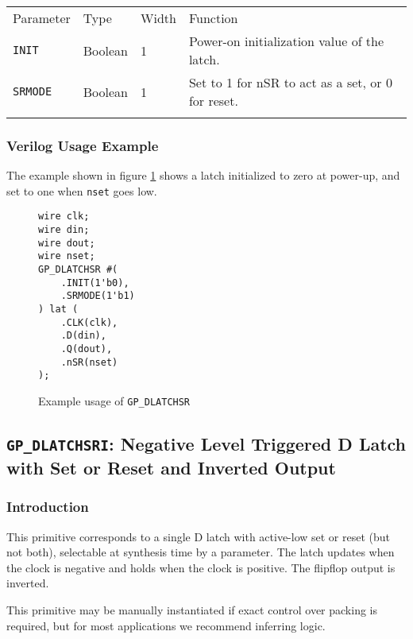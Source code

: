 \documentclass[11pt]{article}
\newcommand{\tokenstyle}[1]{\texttt{#1}}
\newcommand{\wirestyle}[1]{\texttt{#1}}
\newcommand{\whenstyle}[1]{{\fontseries{sb}\selectfont#1}}
\newcommand{\thinhline}{\Xhline{1\arrayrulewidth}}
\newcommand{\thickhline}{\Xhline{2.5\arrayrulewidth}}
\begin{document}
\begin{tabularx}{\textwidth}{lllX}
\thinhline
\whenstyle{Parameter} & \whenstyle{Type} & \whenstyle{Width} & \whenstyle{Function} \\
\thickhline
\tokenstyle{INIT} & Boolean & 1 & Power-on initialization value of the latch.\\
\thinhline
\tokenstyle{SRMODE} & Boolean & 1 & Set to 1 for nSR to act as a set, or 0 for reset. \\
\thinhline
\end{tabularx}

\subsubsection{Verilog Usage Example}

The example shown in figure \ref{gp-dlatchsr-example} shows a latch initialized to zero at power-up, and set to one
when \wirestyle{nset} goes low.

\begin{figure}[h]
\begin{lstlisting}
wire clk;
wire din;
wire dout;
wire nset;
GP_DLATCHSR #(
	.INIT(1'b0),
	.SRMODE(1'b1)
) lat (
	.CLK(clk),
	.D(din),
	.Q(dout),
	.nSR(nset)
);
\end{lstlisting}
\caption{Example usage of \tokenstyle{GP\_DLATCHSR}}
\label{gp-dlatchsr-example}
\end{figure}


\pagebreak
\subsection{\tokenstyle{GP\_DLATCHSRI}: Negative Level Triggered D Latch with Set or Reset and Inverted Output}
\label{gp-latchsri}

\subsubsection{Introduction}
This primitive corresponds to a single D latch with active-low set or reset (but not both), selectable at synthesis time by
a parameter. The latch updates when the clock is negative and holds when the clock is positive. The flipflop output is
inverted.

This primitive may be manually instantiated if exact control over packing is required, but for most applications we
recommend inferring logic.
\end{document}
